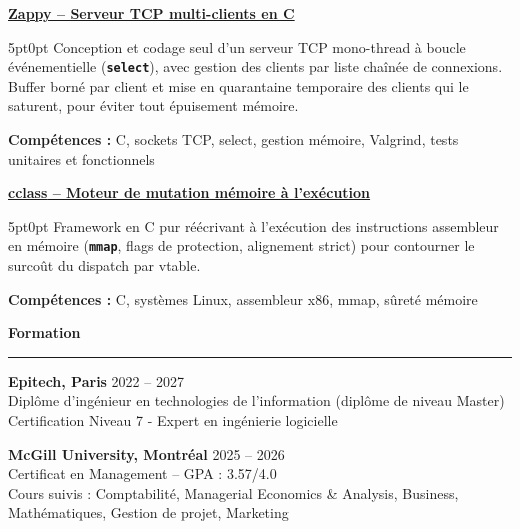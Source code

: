 \documentclass[9pt]{extarticle}
\begin{document}
\underline{\bfseries Zappy -- Serveur TCP multi-clients en C}
\par
\begin{adjustwidth}{5pt}{0pt}
    Conception et codage seul d'un serveur TCP mono-thread à boucle événementielle ({\bfseries \texttt{select}}), avec gestion des clients par liste chaînée de connexions. \\
    Buffer borné par client et mise en quarantaine temporaire des clients qui le saturent, pour éviter tout épuisement mémoire.
\end{adjustwidth}
\par
{\bfseries Compétences :} C, sockets TCP, select, gestion mémoire, Valgrind, tests unitaires et fonctionnels

\par\vspace{8pt}

\underline{\bfseries \href{https://github.com/paulogarithm/cclass}{cclass} -- Moteur de mutation mémoire à l'exécution}
\par
\begin{adjustwidth}{5pt}{0pt}
    Framework en C pur réécrivant à l'exécution des instructions assembleur en mémoire ({\bfseries \texttt{mmap}}, flags de protection, alignement strict) pour contourner le surcoût du dispatch par vtable.
\end{adjustwidth}
\par
{\bfseries Compétences :} C, systèmes Linux, assembleur x86, mmap, sûreté mémoire

\par\vspace{8pt}

{\large\bfseries Formation}
\par\vspace{-8pt}
\rule{\linewidth}{0.4pt}
\par\vspace{5pt}

{\bfseries Epitech, Paris} \hfill 2022 -- 2027 \\
Diplôme d'ingénieur en technologies de l'information (diplôme de niveau Master) \\
Certification Niveau 7 - Expert en ingénierie logicielle

\vspace{6pt}

{\bfseries McGill University, Montréal} \hfill 2025 -- 2026 \\
Certificat en Management -- GPA : 3.57/4.0 \\
Cours suivis : Comptabilité, Managerial Economics \& Analysis, Business, Mathématiques, Gestion de projet, Marketing
\end{document}
